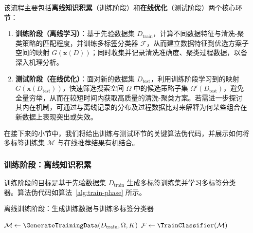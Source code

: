 \documentclass[10pt]{article} %
\numberwithin{equation}{section}
\begin{document}
该流程主要包括\textbf{离线知识积累}（训练阶段）和\textbf{在线优化}（测试阶段）两个核心环节：
\begin{enumerate}
    \item \textbf{训练阶段（离线学习）}：基于先验数据集 $D_{\text{train}}$，计算不同数据特征与清洗-聚类策略的匹配程度，并训练多标签分类器 $\mathcal{F}$，从而建立数据特征到优选方案子空间的映射 $G(\mathbf{x}(D))$；同时收集并记录清洗准确度、聚类过程数据，以备深入机理分析。
    \item \textbf{测试阶段（在线优化）}：面对新的数据集 $D_{\text{test}}$，利用训练阶段学习到的映射 $G(\mathbf{x}(D_{\text{test}}))$，快速筛选搜索空间 $\Omega$ 中的候选策略子集 $\Omega'(D_{\text{test}})$，避免全量穷举，从而在较短时间内获取高质量的清洗-聚类方案。若需进一步探讨其内在机制，可通过与离线记录的分布及过程数据比对来解释为何某些组合在新数据上表现突出或失效。
\end{enumerate}

在接下来的小节中，我们将给出训练与测试环节的关键算法伪代码，并展示如何将多标签训练集 $\mathcal{M}$ 与在线推荐结果有机结合。

\subsubsection{训练阶段：离线知识积累}
训练阶段的目标是基于先验数据集 \(D_{\text{train}}\) 生成多标签训练集并学习多标签分类器。算法伪代码如算法~\ref{alg:train-phase} 所示。

\begin{algorithm}[H]
\caption{离线训练阶段：生成训练数据与训练多标签分类器}
\label{alg:train-phase}


$\mathcal{M} \leftarrow \GenerateTrainingData(D_{\text{train}}, \Omega, K)$\;
$\mathcal{F} \leftarrow \TrainClassifier(\mathcal{M})$\;

\bigskip


\end{algorithm}
\end{document}
